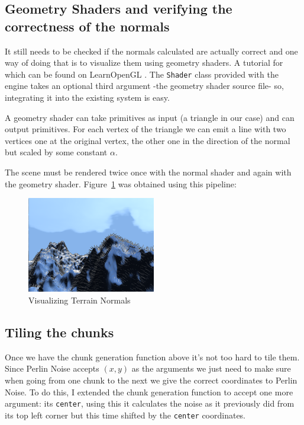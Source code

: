 \subsection{Geometry Shaders and verifying the correctness of the normals}

It still needs to be checked if the normals calculated are actually correct and one way of doing that is to visualize them using geometry shaders. A tutorial for which can be found on LearnOpenGL \cite{learnopengl}. The \texttt{Shader} class provided with the engine takes an optional third argument -the geometry shader source file- so, integrating it into the existing system is easy.  

A geometry shader can take primitives as input (a triangle in our case) and can output primitives. For each vertex of the triangle we can emit a line with two vertices one at the original vertex, the other one in the direction of the normal but scaled by some constant $\alpha$.

The scene must be rendered twice once with the normal shader and again with the geometry shader. Figure~\ref{fig:terrain_normals} was obtained using this pipeline:
\begin{figure}[H]
    \centering
    \includegraphics[width=0.5\textwidth]{images/normals.png}
    \caption{Visualizing Terrain Normals}
    \label{fig:terrain_normals}
\end{figure}


\subsection{Tiling the chunks}
Once we have the chunk generation function above it's not too hard to tile them. Since Perlin Noise accepts $(x, y)$ as the arguments we just need to make sure when going from one chunk to the next we give the correct coordinates to Perlin Noise. To do this, I extended the chunk generation function to accept one more argument: its \texttt{center}, using this it calculates the noise as it previously did from its top left corner but this time shifted by the \texttt{center} coordinates.

